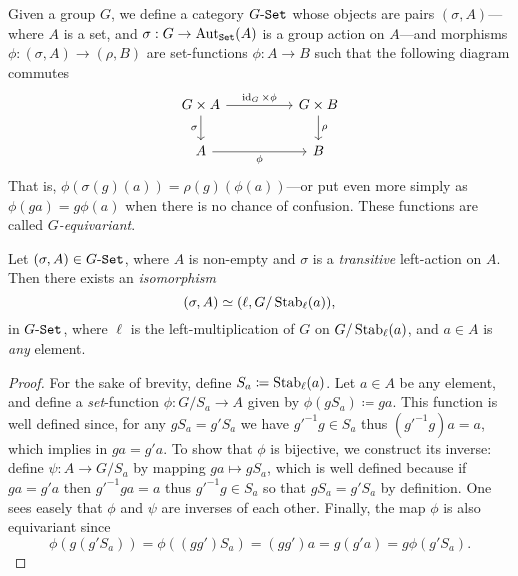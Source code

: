\begin{definition}
    \label{def:G-set-category}
    Given a group \(G\), we define a category \({{G}\text{-}{\texttt{Set}}}\) whose objects are pairs
    \((\sigma, A)\)---where \(A\) is a set, and \(\sigma: G \to \operatorname{Aut}_{{\texttt{Set}}}(A)\)
    is a group action on \(A\)---and morphisms \(\phi: (\sigma, A) \to (\rho, B)\)
    are set-functions \(\phi: A \to B\) such that the following diagram commutes
    \[
        \begin{tikzcd}
            G \times A \ar[d, "\sigma"'] \ar[rr, "\Id_G \times \phi"]
            &&G \times B \ar[d, "\rho"] \\
            A \ar[rr, "\phi"'] &&B
        \end{tikzcd}
    \]
    That is, \(\phi(\sigma(g)(a)) = \rho(g)(\phi(a))\)---or put even more simply
    as \(\phi(g a) = g \phi(a)\) when there is no chance of confusion. These
    functions are called \emph{\(G\)-equivariant}.
\end{definition}

\begin{proposition}
    \label{prop:transitive-G-set-iso-left-mul-G/Stab}
    Let \((\sigma, A) \in {{G}\text{-}{\texttt{Set}}}\), where \(A\) is non-empty and \(\sigma\)
    is a \emph{transitive} left-action on \(A\). Then there exists an
    \emph{isomorphism}
    \[
        (\sigma, A) \simeq (\ell, G/\operatorname{Stab}_{\ell}(a)),
    \]
    in \({{G}\text{-}{\texttt{Set}}}\), where \(\ell\) is the left-multiplication of \(G\)
    on \(G/\operatorname{Stab}_{\ell}(a)\), and \(a \in A\) is \emph{any} element.
\end{proposition}

\begin{proof}
    For the sake of brevity, define \(S_a \coloneq \operatorname{Stab}_{\ell}(a)\). Let
    \(a \in A\) be any element, and define a \emph{set}-function
    \(\phi: G/S_a \to A\) given by \(\phi(g S_a) \coloneq g a\). This function is
    well defined since, for any \(g S_a = g' S_a\) we have \(g'^{-1} g \in S_a\)
    thus \((g'^{-1} g) a = a\), which implies in \(g a = g' a\). To show that
    \(\phi\) is bijective, we construct its inverse: define \(\psi: A \to G/S_a\) by
    mapping \(g a \mapsto g S_a\), which is well defined because if \(g a = g' a\)
    then \(g'^{-1} g a = a\) thus \(g'^{-1} g \in S_a\) so that \(g S_a = g' S_a\)
    by definition. One sees easely that \(\phi\) and \(\psi\) are inverses of each
    other. Finally, the map \(\phi\) is also equivariant since
    \[
        \phi(g(g' S_a)) = \phi((g g') S_a) = (g g') a = g(g'a) = g \phi(g' S_a).
    \]
\end{proof}

